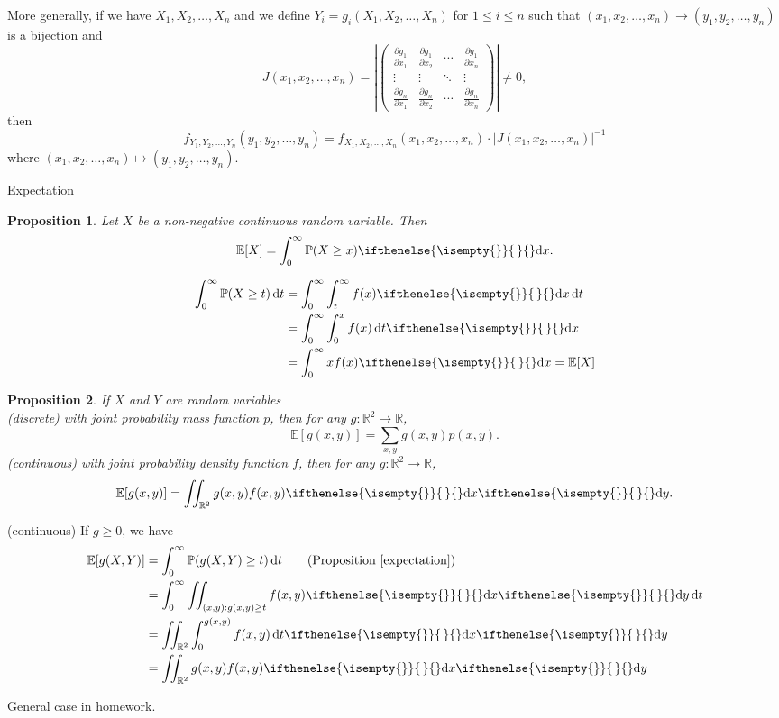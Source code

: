 \documentclass[a4paper,11pt]{amsbook}
\makeatletter
\def\section{\@startsection{section}{2}%
    \z@{1\linespacing\@plus1\linespacing}{.5\linespacing}%
    {\large\normalfont\bfseries\centering\color{darkblue}}}
\renewenvironment{proof}[1][\proofname]{\par
    \pushQED{\qed}%
    \normalfont \topsep6\p@\@plus6\p@\relax
    \trivlist
    \itemindent\z@ %
    \item[\hskip\labelsep
          \scshape
      #1\@addpunct{.}]\ignorespaces
}{%
    \popQED\endtrivlist\@endpefalse
}
\newtheorem{proposition}{\hspace{-2em} \color{darkblue} Proposition}[chapter]
\theoremstyle{definition}
\theoremstyle{remark}
\newcommand{\R}{\mathbb{R}}
\newcommand{\E}{\mathbb{E}}
\renewcommand{\P}{\mathbb{P}}
\newcommand{\abs}[1]{\left|#1\right|}
\newcommand\0{\varnothing}
\newcommand\dx[1][]{\ifthenelse{\isempty{#1}}{\,}{}\mathrm{d}x}
\newcommand\dy[1][]{\ifthenelse{\isempty{#1}}{\,}{}\mathrm{d}y}
\newcommand\dt[1][t]{\,\mathrm{d}#1}
\newcommand\pdiff[2][]
{
    \frac{\partial#1}{\partial#2}
}
\makeatother
\begin{document}
    More generally, if we have $X_1,X_2,\ldots,X_n$ and we define $Y_i=g_i(X_1,X_2,\ldots,X_n)$ for $1\leq i\leq n$
    such that $(x_1,x_2,\ldots,x_n)\to(y_1,y_2,\ldots,y_n)$ is a bijection and
    $$J(x_1,x_2,\ldots,x_n)=\abs{\begin{pmatrix}
        \pdiff[g_1]{x_1} & \pdiff[g_1]{x_2} & \cdots & \pdiff[g_1]{x_n} \\[15pt]
        \vdots & \vdots & \ddots & \vdots \\[15pt]
        \pdiff[g_n]{x_1} & \pdiff[g_n]{x_2} & \cdots & \pdiff[g_n]{x_n}
    \end{pmatrix}}\neq0,$$
    then $$f_{Y_1,Y_2,\ldots,Y_n}(y_1,y_2,\ldots,y_n)=f_{X_1,X_2,\ldots,X_n}(x_1,x_2,\ldots,x_n)\cdot\abs{J(x_1,x_2,\ldots,x_n)}^{-1}$$
    where $(x_1,x_2,\ldots,x_n)\mapsto(y_1,y_2,\ldots,y_n)$.

    \section{Expectation}

    \begin{proposition} \label{expectation}
        Let $X$ be a non-negative continuous random variable. Then
        $$\E[X]=\int_0^\infty \P(X\geq x)\dx.$$
    \end{proposition}
    \begin{proof}
        \begin{align*}
            \int_0^\infty \P(X\geq t)\dt&=\int_0^\infty\int_t^\infty f(x)\dx\dt \\
            &=\int_0^\infty\int_0^x f(x)\dt\dx \\
            &=\int_0^\infty x f(x)\dx=\E[X]
        \end{align*}
    \end{proof}

    \begin{proposition}
        If $X$ and $Y$ are random variables\\ 
        (discrete) with joint probability mass function $p$, then
        for any $g:\R^2\to\R$, $$\E[g(x,y)]=\sum_{x,y}g(x,y)p(x,y).$$
        (continuous) with joint probability density function $f$, then
        for any $g:\R^2\to\R$, $$\E[g(x,y)]=\iint_{\R^2}g(x,y)f(x,y)\dx\dy.$$
    \end{proposition}
    \begin{proof}
        (continuous) If $g\geq0$, we have \begin{align*}
            \E[g(X,Y)]&=\int_0^\infty\P(g(X,Y)\geq t)\dt \tag{Proposition \ref{expectation}} \\
            &=\int_0^\infty\iint_{(x,y):g(x,y)\geq t}f(x,y)\dx\dy\dt \\
            &=\iint_{\R^2}\int_0^{g(x,y)} f(x,y)\dt\dx\dy \\
            &=\iint_{\R^2}g(x,y)f(x,y)\dx\dy
        \end{align*}
        
        General case in homework.
    \end{proof}
\end{document}
